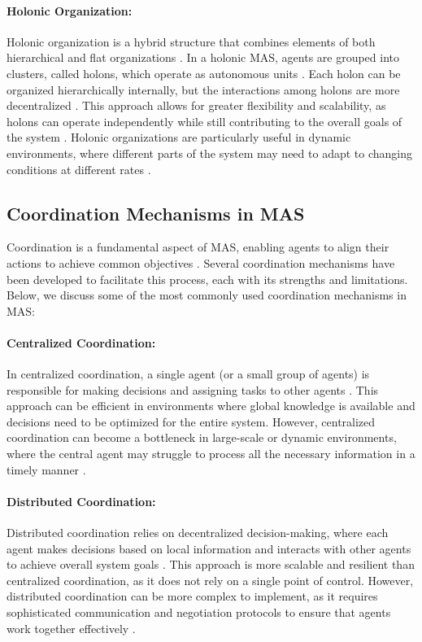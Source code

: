 \paragraph{Holonic Organization:}
Holonic organization is a hybrid structure that combines elements of both hierarchical and flat organizations \cite{durfee1999distributed}. In a holonic MAS, agents are grouped into clusters, called holons, which operate as autonomous units \cite{weiss1999multiagent}. Each holon can be organized hierarchically internally, but the interactions among holons are more decentralized \cite{durfee1999distributed}. This approach allows for greater flexibility and scalability, as holons can operate independently while still contributing to the overall goals of the system \cite{weiss1999multiagent}. Holonic organizations are particularly useful in dynamic environments, where different parts of the system may need to adapt to changing conditions at different rates \cite{durfee1999distributed}.

\subsection{Coordination Mechanisms in MAS}

Coordination is a fundamental aspect of MAS, enabling agents to align their actions to achieve common objectives \cite{wooldridge2009introduction}. Several coordination mechanisms have been developed to facilitate this process, each with its strengths and limitations. Below, we discuss some of the most commonly used coordination mechanisms in MAS:

\paragraph{Centralized Coordination:}
In centralized coordination, a single agent (or a small group of agents) is responsible for making decisions and assigning tasks to other agents \cite{jennings1998roadmap}. This approach can be efficient in environments where global knowledge is available and decisions need to be optimized for the entire system. However, centralized coordination can become a bottleneck in large-scale or dynamic environments, where the central agent may struggle to process all the necessary information in a timely manner \cite{weiss1999multiagent}.

\paragraph{Distributed Coordination:}
Distributed coordination relies on decentralized decision-making, where each agent makes decisions based on local information and interacts with other agents to achieve overall system goals \cite{durfee1999distributed}. This approach is more scalable and resilient than centralized coordination, as it does not rely on a single point of control. However, distributed coordination can be more complex to implement, as it requires sophisticated communication and negotiation protocols to ensure that agents work together effectively \cite{jennings1998roadmap}.

